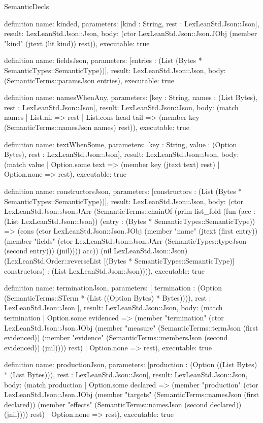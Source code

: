 \begin{lexlean}{SemanticDecls}
\begin{semanticmodule}
definition{
  name: kinded,
  parameters: [kind : String, rest : LexLeanStd.Json::Json],
  result: LexLeanStd.Json::Json,
  body: (ctor LexLeanStd.Json::Json.JObj (member "kind" (jtext (lit kind)) rest)),
  executable: true
}

definition{
  name: fieldsJson,
  parameters: [entries : (List (Bytes * SemanticTypes::SemanticType))],
  result: LexLeanStd.Json::Json,
  body: (SemanticTerms::paramsJson entries),
  executable: true
}

definition{
  name: namesWhenAny,
  parameters: [key : String, names : (List Bytes), rest : LexLeanStd.Json::Json],
  result: LexLeanStd.Json::Json,
  body: (match names
    | List.nil => rest
    | List.cons head tail => (member key (SemanticTerms::namesJson names) rest)),
  executable: true
}

definition{
  name: textWhenSome,
  parameters: [key : String, value : (Option Bytes), rest : LexLeanStd.Json::Json],
  result: LexLeanStd.Json::Json,
  body: (match value | Option.some text => (member key (jtext text) rest) | Option.none => rest),
  executable: true
}

definition{
  name: constructorsJson,
  parameters: [constructors : (List (Bytes * SemanticTypes::SemanticType))],
  result: LexLeanStd.Json::Json,
  body: (ctor LexLeanStd.Json::Json.JArr (SemanticTerms::chainOf (prim list_fold (fun (acc : (List LexLeanStd.Json::Json)) (entry : (Bytes * SemanticTypes::SemanticType)) => (cons (ctor LexLeanStd.Json::Json.JObj (member "name" (jtext (first entry)) (member "fields" (ctor LexLeanStd.Json::Json.JArr (SemanticTypes::typeJson (second entry))) (jnil)))) acc)) (nil LexLeanStd.Json::Json) (LexLeanStd.Order::reverseList [(Bytes * SemanticTypes::SemanticType)] constructors) : (List LexLeanStd.Json::Json)))),
  executable: true
}

definition{
  name: terminationJson,
  parameters: [
    termination : (Option (SemanticTerms::STerm * (List ((Option Bytes) * Bytes)))),
    rest : LexLeanStd.Json::Json
  ],
  result: LexLeanStd.Json::Json,
  body: (match termination
    | Option.some evidenced => (member "termination" (ctor LexLeanStd.Json::Json.JObj (member "measure" (SemanticTerms::termJson (first evidenced)) (member "evidence" (SemanticTerms::membersJson (second evidenced)) (jnil)))) rest)
    | Option.none => rest),
  executable: true
}

definition{
  name: productionJson,
  parameters: [production : (Option ((List Bytes) * (List Bytes))), rest : LexLeanStd.Json::Json],
  result: LexLeanStd.Json::Json,
  body: (match production
    | Option.some declared => (member "production" (ctor LexLeanStd.Json::Json.JObj (member "targets" (SemanticTerms::namesJson (first declared)) (member "effects" (SemanticTerms::namesJson (second declared)) (jnil)))) rest)
    | Option.none => rest),
  executable: true
}


\end{semanticmodule}
\end{lexlean}
